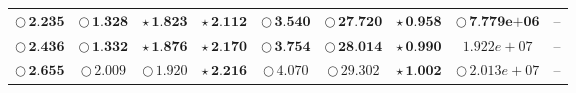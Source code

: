 \documentclass[
]{article}
\begin{document}
\begin{table}[!h]
\begin{tabular}[t]{ccccccccc}
\cellcolor[HTML]{2297E6}$\bigcirc\,\textbf{2.235}$ & \cellcolor[HTML]{DF536B}$\bigcirc\,\textbf{1.328}$ & \cellcolor[HTML]{DF536B}$\star\,\textbf{1.823}$ & \cellcolor[HTML]{F5C710}$\star\,\textbf{2.112}$ & \cellcolor[HTML]{2297E6}$\bigcirc\,\textbf{3.540}$ & \cellcolor[HTML]{2297E6}$\bigcirc\,\textbf{27.720}$ & \cellcolor[HTML]{F5C710}$\star\,\textbf{0.958}$ & \cellcolor[HTML]{2297E6}$\bigcirc\,\textbf{7.779e+06}$ & --\\
\cellcolor[HTML]{DF536B}$\bigcirc\,\textbf{2.436}$ & \cellcolor[HTML]{F5C710}$\bigcirc\,\textbf{1.332}$ & \cellcolor[HTML]{2297E6}$\star\,\textbf{1.876}$ & \cellcolor[HTML]{2297E6}$\star\,\textbf{2.170}$ & \cellcolor[HTML]{F5C710}$\bigcirc\,\textbf{3.754}$ & \cellcolor[HTML]{F5C710}$\bigcirc\,\textbf{28.014}$ & \cellcolor[HTML]{2297E6}$\star\,\textbf{0.990}$ & \cellcolor[HTML]{FFFFFF}$1.922e+07$ & --\\
\cellcolor[HTML]{F5C710}$\bigcirc\,\textbf{2.655}$ & \cellcolor[HTML]{FFFFFF}$\bigcirc\,2.009$ & \cellcolor[HTML]{FFFFFF}$\bigcirc\,1.920$ & \cellcolor[HTML]{DF536B}$\star\,\textbf{2.216}$ & \cellcolor[HTML]{FFFFFF}$\bigcirc\,4.070$ & \cellcolor[HTML]{FFFFFF}$\bigcirc\,29.302$ & \cellcolor[HTML]{DF536B}$\star\,\textbf{1.002}$ & \cellcolor[HTML]{FFFFFF}$\bigcirc\,2.013e+07$ & --\\
\bottomrule
\end{tabular}
\end{table}
\end{document}
